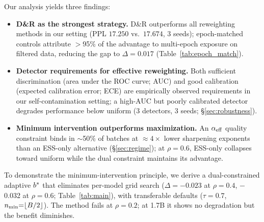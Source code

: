 Our analysis yields three findings:
\begin{itemize}[nosep,leftmargin=*]
\item \textbf{D\&R as the strongest strategy.}
D\&R outperforms all reweighting methods in our setting (PPL $17.250$ vs.\ $17.674$, 3 seeds); epoch-matched controls attribute ${>}$95\% of the advantage to multi-epoch exposure on filtered data, reducing the gap to $\Delta{=}0.017$ (Table~\ref{tab:epoch_match}).

\item \textbf{Detector requirements for effective reweighting.}
Both sufficient discrimination (area under the ROC curve; AUC) and good calibration (expected calibration error; ECE) are empirically observed requirements in our self-contamination setting; a high-AUC but poorly calibrated detector degrades performance below uniform (3 detectors, 3 seeds; \S\ref{sec:robustness}).

\item \textbf{Minimum intervention outperforms maximization.}
An $\alpha_{\mathrm{eff}}$ quality constraint binds in ${\sim}$50\% of batches at ${\approx}4{\times}$ lower sharpening exponents than an ESS-only alternative (\S\ref{sec:regime}); at $\rho{=}0.6$, ESS-only collapses toward uniform while the dual constraint maintains its advantage.
\end{itemize}
To demonstrate the minimum-intervention principle, we derive a dual-constrained adaptive $b^*$ that eliminates per-model grid search ($\Delta{=}{-}0.023$ at $\rho{=}0.4$, $-$0.032 at $\rho{=}0.6$; Table~\ref{tab:main}), with transferable defaults ($\tau{=}0.7$, $n_{\min}{=}\lfloor B/2 \rfloor$).
The method fails at $\rho{=}0.2$; at 1.7B it shows no degradation but the benefit diminishes.

